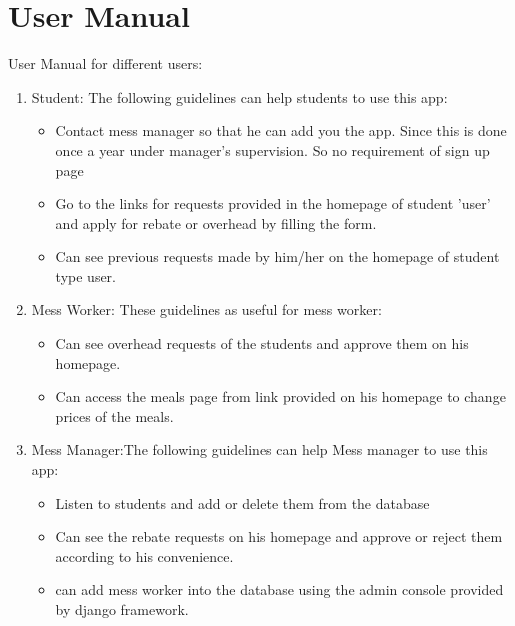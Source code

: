 \section{User Manual}
User Manual for different users:
\begin{enumerate}
    \item Student: The following guidelines can help students to use this app:\\
    \begin{itemize}
        \item Contact mess manager so that he can add you the app. Since this is done once a year under manager's supervision. So no requirement of sign up page
        \item Go to the links for requests provided in the homepage of student 'user' and apply for rebate or overhead by filling the form.
        \item Can see previous requests made by him/her on the homepage of student type user.
    \end{itemize}
    \item Mess Worker: These guidelines as useful for mess worker:\\
    \begin{itemize}
        \item Can see overhead requests of the students and approve them on his homepage.
        \item Can access the meals page from link provided on his homepage to change prices of the meals.
        \end{itemize}
    \item Mess Manager:The following guidelines can help Mess manager to use this app: \\
    \begin{itemize}
        \item Listen to students and add or delete them from the database
        \item Can see the rebate requests on his homepage and  approve or reject them according to his convenience.
        \item can add mess worker into the database using the admin console provided by django framework.
    \end{itemize}
    
\end{enumerate}

